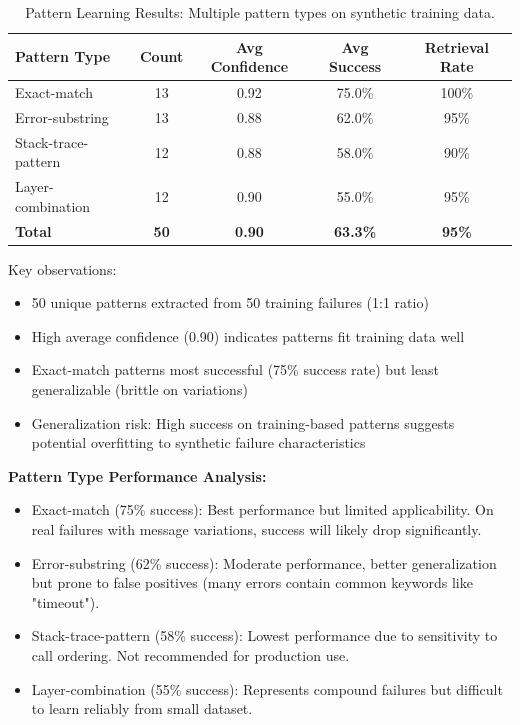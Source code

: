 \documentclass[11pt]{article}
\begin{document}
\begin{table}[h!]
\centering
\begin{tabular}{lcccc}
\toprule
\textbf{Pattern Type} & \textbf{Count} & \textbf{Avg Confidence} & \textbf{Avg Success} & \textbf{Retrieval Rate} \\
\midrule
Exact-match & 13 & 0.92 & 75.0\% & 100\% \\
Error-substring & 13 & 0.88 & 62.0\% & 95\% \\
Stack-trace-pattern & 12 & 0.88 & 58.0\% & 90\% \\
Layer-combination & 12 & 0.90 & 55.0\% & 95\% \\
\midrule
\textbf{Total} & \textbf{50} & \textbf{0.90} & \textbf{63.3\%} & \textbf{95\%} \\
\bottomrule
\end{tabular}
\caption{Pattern Learning Results: Multiple pattern types on synthetic training data.}
\label{tab:pattern_results}
\end{table}

Key observations:
\begin{itemize}
    \item 50 unique patterns extracted from 50 training failures (1:1 ratio)
    \item High average confidence (0.90) indicates patterns fit training data well
    \item Exact-match patterns most successful (75\% success rate) but least generalizable (brittle on variations)
    \item Generalization risk: High success on training-based patterns suggests potential overfitting to synthetic failure characteristics
\end{itemize}

\textbf{Pattern Type Performance Analysis:}
\begin{itemize}
    \item Exact-match (75\% success): Best performance but limited applicability. On real failures with message variations, success will likely drop significantly.
    \item Error-substring (62\% success): Moderate performance, better generalization but prone to false positives (many errors contain common keywords like "timeout").
    \item Stack-trace-pattern (58\% success): Lowest performance due to sensitivity to call ordering. Not recommended for production use.
    \item Layer-combination (55\% success): Represents compound failures but difficult to learn reliably from small dataset.
\end{itemize}
\end{document}
